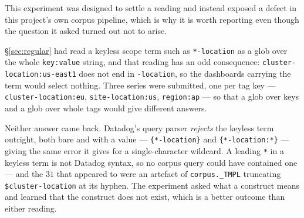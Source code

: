 \begin{remark}\label{rem:keyless-glob}
This experiment was designed to settle a reading and instead exposed a defect in this
project's own corpus pipeline, which is why it is worth reporting even though the
question it asked turned out not to arise.

\S\ref{sec:regular} had read a keyless scope term such as \texttt{*-location} as a glob
over the whole \texttt{key:value} string, and that reading has an odd consequence:
\texttt{cluster-location:us-east1} does not end in \texttt{-location}, so the dashboards
carrying the term would select nothing. Three series were submitted, one per tag key ---
\texttt{cluster-location:eu}, \texttt{site-location:us}, \texttt{region:ap} --- so that
a glob over keys and a glob over whole tags would give different answers.

Neither answer came back. Datadog's query parser \emph{rejects} the keyless term
outright, both bare and with a value --- \texttt{\{*-location\}} and
\texttt{\{*-location:*\}} --- giving the same error it gives for a single-character
wildcard. A leading \texttt{*} in a keyless term is not Datadog
syntax, so no corpus query could have contained one --- and the $31$ that appeared to
were an artefact of \texttt{corpus.\_TMPL} truncating \texttt{\$cluster-location} at its
hyphen. The experiment asked what a construct means and learned that the construct does
not exist, which is a better outcome than either reading.
\end{remark}
